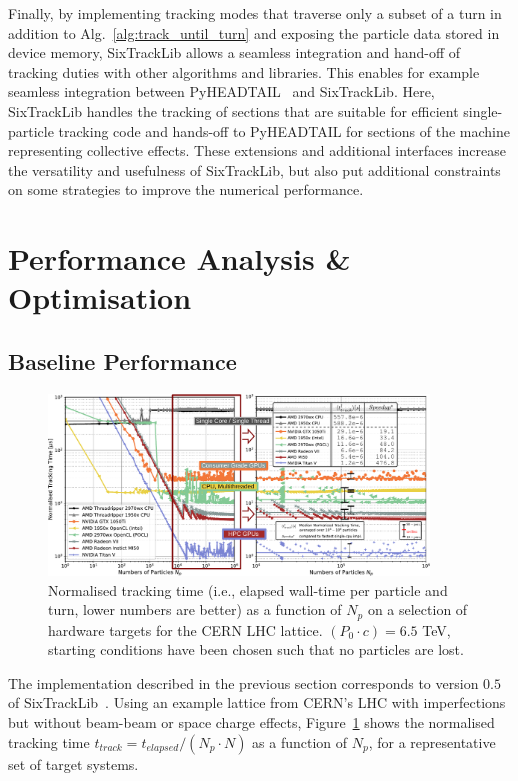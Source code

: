 \documentclass[a4paper,
               refpage,       %
               keeplastbox,   %
               ]{jacow}
\begin{document}
Finally, by implementing tracking modes that traverse only a subset of a turn in addition to Alg.~\ref{alg:track_until_turn} and exposing the particle data stored in device memory, SixTrackLib allows a seamless integration and hand-off of tracking duties with other algorithms and libraries. 
This enables for example seamless integration between  PyHEADTAIL~\cite{pyheadtail-repo-2021} and SixTrackLib. Here, SixTrackLib handles the tracking of sections that are suitable for efficient single-particle tracking code and hands-off to PyHEADTAIL for sections of the machine representing collective effects.
These extensions and additional interfaces increase the versatility and usefulness of SixTrackLib, but also put additional constraints on some strategies to improve the numerical performance.


\section{Performance Analysis \& Optimisation}
\subsection{Baseline Performance}
\begin{figure}[h!t]
    \centering
    \includegraphics*[width=0.9\textwidth]{THPAB190_f4}
    \caption{Normalised tracking time (i.e., elapsed wall-time per particle and turn, lower numbers are better) as a function of $N_{p}$ on a selection of hardware targets for the CERN LHC lattice. $(P_0\cdot c) = 6.5$ TeV, starting conditions have been chosen such that no particles are lost.}
    \label{fig:baseline_performance}
\end{figure}
The implementation described in the previous section corresponds to version $0.5$ of SixTrackLib~\cite{sixtracklib-repo-2021}. Using an example lattice from CERN's LHC with imperfections but without beam-beam or space charge effects, Figure~\ref{fig:baseline_performance} shows the normalised tracking time $t_{track} = t_{elapsed}/(N_{p}\cdot N)$ as a function of $N_{p}$,  for a representative set of target systems. 
\end{document}
